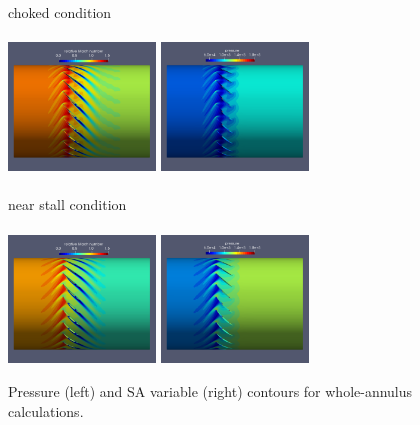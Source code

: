 \documentclass[journal,final]{new-aiaa}
\begin{document}
\begin{figure}[htb]
	\centering    
	choked condition \\
	~\\	
	\includegraphics[width=0.35\textwidth]{rotor67-2d-rel-mach-0kpa.png}
	\includegraphics[width=0.35\textwidth]{rotor67-2d-pres-0kpa.png}\\
	~\\
	near stall condition\\
	~\\
	\includegraphics[width=0.35\textwidth]{rotor67-2d-rel-mach-18d5kpa.png}
	\includegraphics[width=0.35\textwidth]{rotor67-2d-pres-18d5kpa.png}
	\caption{Pressure (left) and SA variable (right) contours for
	whole-annulus calculations.}
	\label{fig:r67-flow}
\end{figure}
\end{document}
